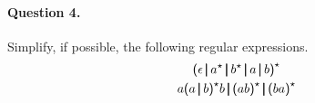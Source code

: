 \paragraph{Question 4.} Simplify, if possible, the following regular
expressions.
\begin{gather*}
  \textsf{(} \epsilon \, \pmb{\lvert}{} \, a^{\star}{} \, \pmb{\lvert}{} \,
  b^{\star}{} \, \pmb{\lvert}{} \, a \, \pmb{\lvert}{} \, b \textsf{)}^{\star}\\
  a \textsf{(} a \, \pmb{\lvert}{} \, b \textsf{)}^{\star}{} b 
  \, \pmb{\lvert}{} \, \textsf{(} a b \textsf{)}^{\star}{} 
  \, \pmb{\lvert}{} \, \textsf{(} b a \textsf{)}^{\star}
\end{gather*}
